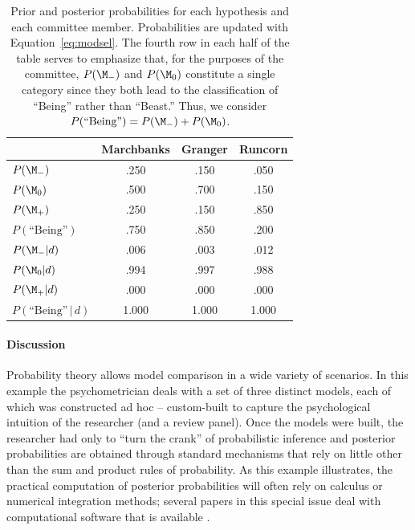 \begin{table}[!htb]\centering
\caption{
Prior and posterior probabilities for each hypothesis and each committee member. Probabilities are updated with Equation~\ref{eq:modsel}. The fourth row in each half of the table serves to emphasize that, for the purposes of the committee, $P(\M_-)$ and $P(\M_0)$ constitute a single category since they both lead to the classification of ``Being'' rather than ``Beast.'' Thus, we consider $P(\mbox{``Being''}) = P(  \M_-) + P(  \M_0)$.}\label{tab:bi0:elf}
\begin{tabular}{lccc}
             & Marchbanks& Granger & Runcorn \\ \hline
 $P(  \M_-)$ &   \p.250  & \p.150  & \p.050  \\
 $P(  \M_0)$ &   \p.500  & \p.700  & \p.150  \\
 $P(  \M_+)$ &   \p.250  & \p.150  & \p.850  \\
 $P(\mbox{``Being''})$ & \p.750 & \p.850 & \p.200 \\
 \hline
 $P(  \M_-|d)$ &   \p.006  & \p.003  & \p.012 \\
 $P(  \M_0|d)$ &   \p.994  & \p.997  & \p.988 \\
 $P(  \M_+|d)$ &   \p.000  & \p.000  & \p.000 \\  $P(\mbox{``Being''}\,|\,d)$ & 1.000 & 1.000 & 1.000 \\
 \hline
\end{tabular}
\end{table}


\paragraph{Discussion} Probability theory allows model comparison in a wide variety of scenarios. In this example the psychometrician deals with a set of three distinct models, each of which was constructed ad hoc -- custom-built to capture the psychological intuition of the researcher (and a review panel).  Once the models were built, the researcher had only to ``turn the crank'' of probabilistic inference and posterior probabilities are obtained through standard mechanisms that rely on little other than the sum and product rules of probability.  As this example illustrates, the practical computation of posterior probabilities will often rely on calculus or numerical integration methods{; several papers in this special issue deal with computational software that is available \cite{LoveSI,MatzkeSI,vanravenzwaaijSI,WagenmakersSI}.}

